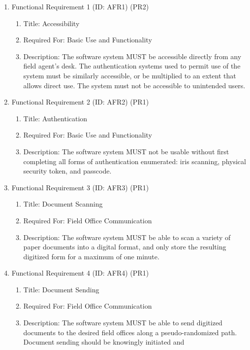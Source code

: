 \documentclass[12pt]{article}
\begin{document}
\begin{enumerate}
    \item Functional Requirement 1 (ID: AFR1) (PR2)
    \begin{enumerate}
        \item Title: Accessibility
        \item Required For: Basic Use and Functionality
        \item Description: The software system MUST be accessible directly from any field agent’s desk.
        The authentication systems used to permit use of the system must be similarly accessible, or be
        multiplied to an extent that allows direct use. The system must not be accessible to unintended users.
    \end{enumerate}
    \item Functional Requirement 2 (ID: AFR2) (PR1)
    \begin{enumerate}
        \item Title: Authentication
        \item Required For: Basic Use and Functionality
        \item Description: The software system MUST not be usable without first completing all forms of
        authentication enumerated: iris scanning, physical security token, and passcode.
    \end{enumerate}
    \item Functional Requirement 3 (ID: AFR3) (PR1)
    \begin{enumerate}
        \item Title: Document Scanning
        \item Required For: Field Office Communication
        \item Description: The software system MUST be able to scan a variety of paper documents into a
        digital format, and only store the resulting digitized form for a maximum of one minute.
    \end{enumerate}
    \item Functional Requirement 4 (ID: AFR4) (PR1)
    \begin{enumerate}
        \item Title: Document Sending
        \item Required For: Field Office Communication
        \item Description: The software system MUST be able to send digitized documents to the desired
        field offices along a pseudo-randomized path. Document sending should be knowingly initiated and

\end{enumerate}
\end{enumerate}
\end{document}
